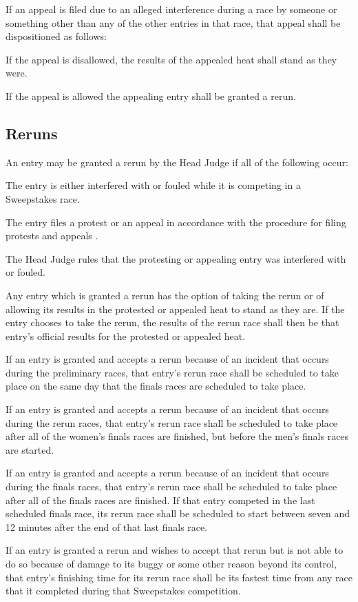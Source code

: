If an appeal is filed due to an alleged interference during a race by someone or something other than any of the other entries in that race, that appeal shall be dispositioned as follows:

If the appeal is disallowed, the results of the appealed heat shall stand as they were.

If the appeal is allowed the appealing entry shall be granted a rerun.

\subsection{Reruns}

An entry may be granted a rerun by the Head Judge if all of the following occur:

The entry is either interfered with or fouled while it is competing in a Sweepstakes race.

The entry files a protest or an appeal in accordance with the procedure for filing protests and appeals .

The Head Judge rules that the protesting or appealing entry was interfered with or fouled.

Any entry which is granted a rerun has the option of taking the rerun or of allowing its results in the protested or appealed heat to stand as they are. If the entry chooses to take the rerun, the results of the rerun race shall then be that entry's official results for the protested or appealed heat.

If an entry is granted and accepts a rerun because of an incident that occurs during the preliminary races, that entry's rerun race shall be scheduled to take place on the same day that the finals races are scheduled to take place.

If an entry is granted and accepts a rerun because of an incident that occurs during the rerun races, that entry's rerun race shall be scheduled to take place after all of the women's finals races are finished, but before the men's finals races are started.

If an entry is granted and accepts a rerun because of an incident that occurs during the finals races, that entry's rerun race shall be scheduled to take place after all of the finals races are finished. If that entry competed in the last scheduled finals race, its rerun race shall be scheduled to start between seven and 12 minutes after the end of that last finals race.

If an entry is granted a rerun and wishes to accept that rerun but is not able to do so because of damage to its buggy or some other reason beyond its control, that entry's finishing time for its rerun race shall be its fastest time from any race that it completed during that Sweepstakes competition.

